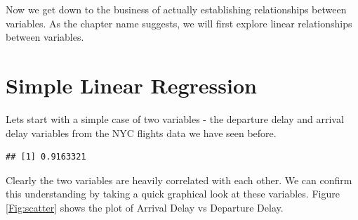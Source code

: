 \documentclass[10pt, letterpaper, twoside]{memoir}\usepackage{knitr}
\begin{document}
\vspace{12pt}


Now we get down to the business of actually establishing relationships between variables. As the chapter name suggests, we will first explore linear relationships between variables. 

\section{Simple Linear Regression}

Lets start with a simple case of two variables - the departure delay and arrival delay variables from the NYC flights data we have seen before.

\begin{knitrout}
\color{fgcolor}\begin{kframe}
\begin{alltt}
 \hlkwb{<-} \hlstd{(}\hlstd{)}
\end{alltt}
\end{kframe}
\end{knitrout}

\begin{knitrout}
\color{fgcolor}\begin{kframe}
\begin{alltt}
\end{alltt}
\end{kframe}
\end{knitrout}

\begin{knitrout}
\color{fgcolor}\begin{kframe}
\begin{alltt}
  \hlstd{=} \hlstd{)}
\end{alltt}
\begin{verbatim}
## [1] 0.9163321
\end{verbatim}
\end{kframe}
\end{knitrout}

  Clearly the two variables are heavily correlated with each other. We can confirm this understanding by taking a quick graphical look at these variables. Figure \ref{Fig:scatter}  shows the plot of Arrival Delay vs Departure Delay. 
\end{document}

